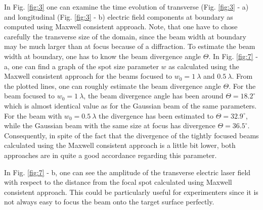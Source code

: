 In Fig. \ref{fig:3} one can examine the time evolution of transverse (Fig. \ref{fig:3} - a) and longitudinal (Fig. \ref{fig:3} - b) electric field components at boundary as computed using Maxwell consistent approach. Note, that one have to chose carefully the transverse size of the domain, since the beam width at boundary may be much larger than at focus because of a diffraction. To estimate the beam width at boundary, one has to know the beam divergence angle $ \Theta $. In Fig. \ref{fig:7} - a, one can find a graph of the spot size parameter $ w $ as calculated using the Maxwell consistent approach for the beams focused to $ w_0 = 1 \: \lambda $ and $ 0.5 \: \lambda $. From the plotted lines, one can roughly estimate the beam divergence angle $ \Theta $. For the beam focused to $ w_0 = 1 \: \lambda $, the beam divergence angle has been around $ \Theta = 18.2 ^{\circ} $ which is almost identical value as for the Gaussian beam of the same parameters. For the beam with $ w_0 = 0.5 \: \lambda $ the divergence has been estimated to $ \Theta = 32.9 ^{\circ} $, while the Gaussian beam with the same size at focus has divergence $ \Theta = 36.5 ^{\circ} $. Consequently, in spite of the fact that the divergence of the tightly focused beams calculated using the Maxwell consistent approach is a little bit lower, both approaches are in quite a good accordance regarding this parameter.

In Fig. \ref{fig:7} - b, one can see the amplitude of the transverse electric laser field with respect to the distance from the focal spot calculated using Maxwell consistent approach. This could be particularly useful for experimenters since it is not always easy to focus the beam onto the target surface perfectly. 

